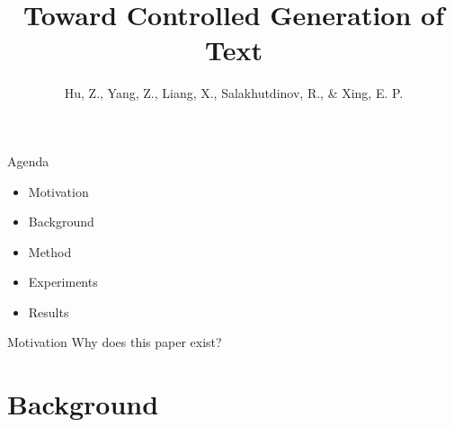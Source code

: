\documentclass{beamer}
\title{Toward Controlled Generation of Text}
\date{}
\author{Hu, Z., Yang, Z., Liang, X., Salakhutdinov, R., \& Xing, E. P.}
\institute{International Conference on Machine Learning. 2017}
\begin{document}
  \maketitle

    \begin{frame}{Agenda}
      \begin{itemize}
      \item Motivation
      \item Background
      \item Method
      \item Experiments
      \item Results
      \end{itemize}
    \end{frame}

    \begin{frame}{Motivation}
      Why does this paper exist?
    \end{frame}

  \section{Background}
\end{document}
